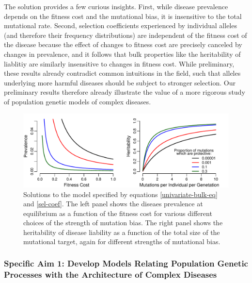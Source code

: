 \documentclass[11pt]{article}
\begin{document}
The solution provides a few curious insights. First, while disease prevalence depends on the fitness cost and the mutational bias, it is insensitive to the total mutational rate. Second, selection coefficients experienced by individual alleles (and therefore their frequency distributions) are independent of the fitness cost of the disease because the effect of changes to fitness cost are precisely canceled by changes in prevalence, and it follows that bulk properties like the heritability of liablitiy are similarly insensitive to changes in fitness cost. While preliminary, these results already contradict common intuitions in the field, such that alleles underlying more harmful diseases should be subject to stronger selection. Our preliminary results therefore already illustrate the value of a more rigorous study of population genetic models of complex diseases.


  \begin{figure}
    \includegraphics[width=\textwidth]{../figures/SimpleModelSolutions.pdf}
    \caption{Solutions to the model specified by equations \eqref{univariate-bulk-eq} and \eqref{sel-coef}. The left panel shows the diseaes prevalence at equilibrium as a function of the fitness cost for various different choices of the strength of mutation bias. The right panel shows the heritability of disease liability as a function of the total size of the mutational target, again for different strengths of mutational bias.}
    \label{simple-model-solve}
  \end{figure}
  



\subsubsection*{Specific Aim 1: Develop Models Relating Population Genetic Processes with the Architecture of Complex Diseases}
\end{document}
